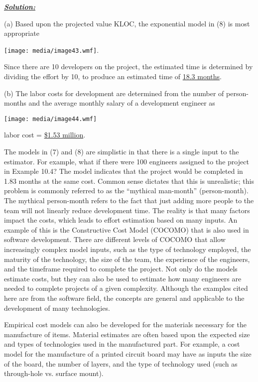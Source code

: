 \emph{\textbf{\ul{Solution:}}}

(a) Based upon the projected value KLOC, the exponential model in (8) is
most appropriate

\texttt{[image: media/image43.wmf]}.

Since there are 10 developers on the project, the estimated time is
determined by dividing the effort by 10, to produce an estimated time of
\ul{18.3 months}.

(b) The labor costs for development are determined from the number of
person-months and the average monthly salary of a development engineer
as

\texttt{[image: media/image44.wmf]}

labor cost = \ul{\$1.53 million}.

The models in (7) and (8) are simplistic in that there is a single input
to the estimator. For example, what if there were 100 engineers assigned
to the project in Example 10.4? The model indicates that the project
would be completed in 1.83 months at the same cost. Common sense
dictates that this is unrealistic; this problem is commonly referred to
as the ``mythical man-month'' (person-month). The mythical person-month
refers to the fact that just adding more people to the team will not
linearly reduce development time. The reality is that many factors
impact the costs, which leads to effort estimation based on many inputs.
An example of this is the Constructive Cost Model (COCOMO) that is also
used in software development. There are different levels of COCOMO that
allow increasingly complex model inputs, such as the type of technology
employed, the maturity of the technology, the size of the team, the
experience of the engineers, and the timeframe required to complete the
project. Not only do the models estimate costs, but they can also be
used to estimate how many engineers are needed to complete projects of a
given complexity. Although the examples cited here are from the software
field, the concepts are general and applicable to the development of
many technologies.

Empirical cost models can also be developed for the materials necessary
for the manufacture of items. Material estimates are often based upon
the expected size and types of technologies used in the manufactured
part. For example, a cost model for the manufacture of a printed circuit
board may have as inputs the size of the board, the number of layers,
and the type of technology used (such as through-hole vs. surface
mount).

